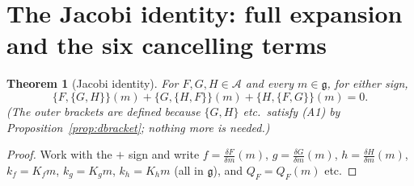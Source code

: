 \documentclass[11pt]{article}
\newtheorem{theorem}{Theorem}[section]
\theoremstyle{definition}
\newcommand{\g}{\mathfrak{g}}
\newcommand{\dF}[1]{\frac{\delta #1}{\delta m}}
\begin{document}
\section{The Jacobi identity: full expansion and the six cancelling terms}\label{sec:jacobi}
\begin{theorem}[Jacobi identity]\label{thm:jacobi}
For $F,G,H\in\mathcal A$ and every $m\in\g$, for either sign,
\[
\{F,\{G,H\}\}(m)+\{G,\{H,F\}\}(m)+\{H,\{F,G\}\}(m)=0 .
\]
(The outer brackets are defined because $\{G,H\}$ etc.\ satisfy (A1) by
Proposition~\ref{prop:dbracket}; nothing more is needed.)
\end{theorem}
\begin{proof}
Work with the $+$ sign and write $f=\dF F(m)$, $g=\dF G(m)$, $h=\dF H(m)$,
$k_f=K_fm$, $k_g=K_gm$, $k_h=K_hm$ (all in $\g$), and $Q_F=Q_F(m)$ etc.


\end{proof}
\end{document}
